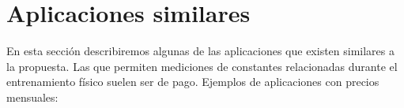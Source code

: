 
\section{Aplicaciones similares}

En esta sección describiremos algunas de las aplicaciones que existen similares a la propuesta. Las que permiten mediciones de constantes relacionadas durante el entrenamiento físico suelen ser de pago. Ejemplos de aplicaciones con precios mensuales:

